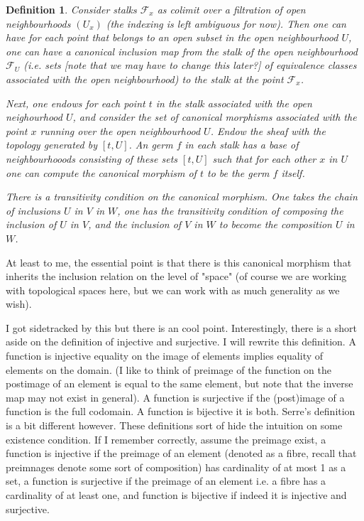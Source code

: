 \documentclass[12pt]{article}
\newtheorem{definition}{Definition}
\begin{document}
\begin{definition}
    Consider stalks $\mathcal{F}_x$ as colimit over a filtration of open neighbourhoods $(U_x)$ (the indexing is left ambiguous for now). Then one can have for each point that belongs to an open subset in the open neighbourhood $U$, one can have a canonical inclusion map from the stalk of the open neighbourhood $\mathcal{F}_{U}$ (i.e. sets [note that we may have to change this later?] of equivalence classes associated with the open neighbourhood) to the stalk at the point $\mathcal{F}_x$.

    Next, one endows for each point $t$ in the stalk associated with the open neighourhood $U$, and consider the set of canonical morphisms associated with the point $x$ running over the open neighbourhood $U$. Endow the sheaf with the topology generated by $[t,U]$. An germ $f$ in each stalk has a base of neighbourhooods consisting of these sets $[t, U]$ such that for each other $x$ in $U$ one can compute the canonical morphism of $t$ to be the germ $f$ itself.

    There is a transitivity condition on the canonical morphism. One takes the chain of inclusions $U$ in $V$ in $W$, one has the transitivity condition of composing the inclusion of $U$ in $V$, and the inclusion of $V$ in $W$ to become the composition $U$ in $W$.
\end{definition}

At least to me, the essential point is that there is this canonical morphism that inherits the inclusion relation on the level of "space" (of course we are working with topological spaces here, but we can work with as much generality as we wish).

I got sidetracked by this but there is an cool point. Interestingly, there is a short aside on the definition of injective and surjective. I will rewrite this definition. A function is injective equality on the image of elements implies equality of elements on the domain. (I like to think of preimage of the function on the postimage of an element is equal to the same element, but note that the inverse map may not exist in general). A function is surjective if the (post)image of a function is the full codomain. A function is bijective it is both. Serre's definition is a bit different however. These definitions sort of hide the intuition on some existence condition. If I remember correctly, assume the preimage exist, a function is injective if the preimage of an element (denoted as a fibre, recall that preimnages denote some sort of composition) has cardinality of at most 1 as a set, a function is surjective if the preimage of an element i.e. a fibre has a cardinality of at least one, and function is bijective if indeed it is injective and surjective.
\end{document}

